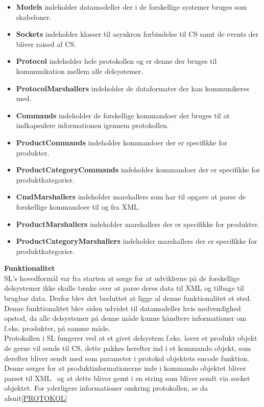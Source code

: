 \begin{itemize}
\item \textbf{Models} indeholder datamodeller der i de forskellige systemer bruges som skabeloner. 
\item \textbf{Sockets} indeholder klasser til asynkron forbindelse til \gls{CS} samt de events der bliver raised af \gls{CS}.
\item \textbf{Protocol} indeholder hele protokollen og er denne der bruges til kommunikation mellem alle delsystemer.
\item \textbf{ProtocolMarshallers} indeholder de dataformater der kan kommunikeres med.
\item \textbf{Commands} indeholder de forskellige kommandoer der bruges til at indkapsulere informationen igennem protokollen.
\item \textbf{ProductCommands} indeholder kommandoer der er specifikke for produkter.
\item \textbf{ProductCategoryCommands} indeholder kommandoer der er specifikke for produktkategorier.
\item \textbf{CmdMarshallers} indeholder marshallers som har til opgave at parse de forskellige kommandoer til og fra XML.
\item \textbf{ProductMarshallers} indeholder marshallers der er specifikke for produkter.
\item \textbf{ProductCategoryMarshallers} indeholder marshallers der er specifikke for produktkategorier.
\end{itemize}

\textbf{Funktionalitet}\\

\gls{SL}'s hovedformål var fra starten at sørge for at udviklerne på de forskellige delsystemer ikke skulle tænke over at parse deres data til XML og tilbage til brugbar data. Derfor blev det besluttet at ligge al denne funktionalitet et sted. Denne funktionalitet blev siden udvidet til datamodeller hvis nødvendighed opstod, da alle delsystemer på denne måde kunne håndtere informationer om f.eks. produkter, på samme måde.\\

Protokollen i \gls{SL} fungerer ved at et givet delsystem f.eks. laver et produkt objekt de gerne vil sende til \gls{CS}, dette pakkes herefter ind i et kommando objekt, som derefter bliver sendt med som parameter i protokol objektets encode funktion. Denne sørger for at produktinformationerne inde i kommando objektet bliver parset til XML~\cite{XML} og at dette bliver gemt i en string som bliver sendt via socket objektet. For yderligere informationer omkring protokollen, se da afsnit\ref{PROTOKOL}\\


